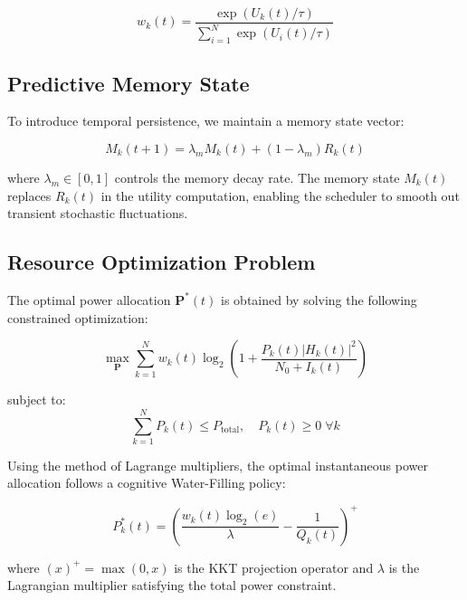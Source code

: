 \documentclass[journal,10pt,twocolumn,twoside]{IEEEtran}
\begin{document}
\begin{equation}
w_k(t) = \frac{\exp\left(U_k(t) / \tau\right)}{\sum_{i=1}^{N} \exp\left(U_i(t) / \tau\right)}
\label{eq:softmax}
\end{equation}

\subsection{Predictive Memory State}

To introduce temporal persistence, we maintain a memory state vector:

\begin{equation}
M_k(t+1) = \lambda_m M_k(t) + (1 - \lambda_m) R_k(t)
\label{eq:memory}
\end{equation}

where $\lambda_m \in [0,1]$ controls the memory decay rate. The memory state $M_k(t)$ replaces $R_k(t)$ in the utility computation, enabling the scheduler to smooth out transient stochastic fluctuations.

\subsection{Resource Optimization Problem}

The optimal power allocation $\mathbf{P}^*(t)$ is obtained by solving the following constrained optimization:

\begin{equation}
\max_{\mathbf{P}} \sum_{k=1}^{N} w_k(t) \log_2\left(1 + \frac{P_k(t) |H_k(t)|^2}{N_0 + I_k(t)}\right)
\label{eq:objective}
\end{equation}

subject to:
\begin{equation}
\sum_{k=1}^{N} P_k(t) \leq P_{\text{total}}, \quad P_k(t) \geq 0 \; \forall k
\label{eq:constraints}
\end{equation}

Using the method of Lagrange multipliers, the optimal instantaneous power allocation follows a cognitive Water-Filling policy:

\begin{equation}
P_k^*(t) = \left(\frac{w_k(t) \log_2(e)}{\lambda} - \frac{1}{Q_k(t)}\right)^{+}
\label{eq:waterfill}
\end{equation}

where $(x)^{+} = \max(0, x)$ is the KKT projection operator and $\lambda$ is the Lagrangian multiplier satisfying the total power constraint.
\end{document}
